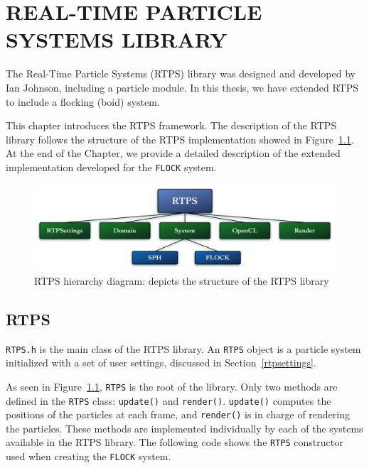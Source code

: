 \chapter{REAL-TIME PARTICLE SYSTEMS LIBRARY}\label{RTPSchapter}

The Real-Time Particle Systems (RTPS) library was designed and developed by Ian Johnson\cite{ianPaper}, including a particle module. In this thesis, we have extended RTPS to include a flocking (boid) system. 

This chapter introduces the RTPS framework. The description of the RTPS library follows the structure of the RTPS implementation showed in Figure~\ref{RTPSdiagram}. At the end of the Chapter, we provide a detailed description of the extended implementation developed for the \texttt{FLOCK} system.

\begin{figure}[htbp]
\begin{center}
\includegraphics[scale=0.38]{figures/RTPSdiagramMyrna.pdf}
\caption{RTPS hierarchy diagram: depicts the structure of the RTPS library}
\label{RTPSdiagram}
\end{center}
\end{figure}

\section{RTPS}\label{rtpssection}
\texttt{RTPS.h} is the main class of the RTPS library. An \texttt{RTPS} object is a particle system initialized with a set of user settings,  discussed in Section~\ref{rtpsettings}. 

As seen in Figure~\ref{RTPSdiagram}, \texttt{RTPS} is the root of the library. Only two methods are defined in the \texttt{RTPS} class: \texttt{update()} and \texttt{render()}. \texttt{update()} computes the positions of the particles at each frame, and \texttt{render()} is in charge of rendering the particles. These methods are implemented individually by each of the systems available in the RTPS library. The following code shows the \texttt{RTPS} constructor used when creating the \texttt{FLOCK} system.

